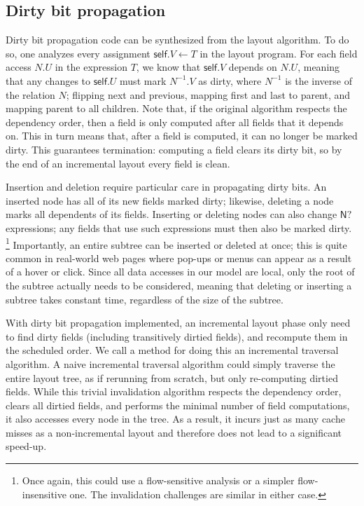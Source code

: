 \subsection{Dirty bit propagation}

Dirty bit propagation code
  can be synthesized from the layout algorithm.
To do so, one analyzes every assignment $\mathsf{self}.V \gets T$
  in the layout program.
For each field access $N.U$ in the expression $T$,
  we know that $\mathsf{self}.V$ depends on $N.U$,
  meaning that any changes to $\mathsf{self}.U$
  must mark $N^{-1}.V$ as dirty,
  where $N^{-1}$ is the inverse of the relation $N$;
  flipping \textsf{next} and \textsf{previous},
  mapping \textsf{first} and \textsf{last} to \textsf{parent},
  and mapping \textsf{parent} to all children.
Note that, if the original algorithm respects the dependency order,
  then a field is only computed after all fields that it depends on.
This in turn means that, after a field is computed,
  it can no longer be marked dirty.
This guarantees termination:
  computing a field clears its dirty bit, so by the end of an incremental layout
  every field is clean.

Insertion and deletion require particular care
  in propagating dirty bits.
An inserted node has all of its new fields marked dirty;
  likewise, deleting a node marks all dependents of its fields.
Inserting or deleting nodes can also change
  $\mathsf{N?}$ expressions;
  any fields that use such expressions must then
  also be marked dirty.%
\footnote{Once again,
  this could use a flow-sensitive analysis or a simpler
  flow-insensitive one.
The invalidation challenges are similar in either case.}
Importantly, an entire subtree can be inserted or deleted at once;
  this is quite common in real-world web pages
  where pop-ups or menus can appear as a result of a hover or click.
Since all data accesses in our model are local,
  only the root of the subtree actually needs to be considered,
  meaning that deleting or inserting a subtree takes constant time,
  regardless of the size of the subtree.

With dirty bit propagation implemented,
  an incremental layout phase only need to 
  find dirty fields (including transitively dirtied fields),
  and recompute them in the scheduled order.
We call a method for doing this an incremental traversal algorithm.
A naive incremental traversal algorithm
  could simply traverse the entire layout tree, 
  as if rerunning from scratch, but only re-computing dirtied fields. 
While this trivial invalidation algorithm
  respects the dependency order, clears all dirtied fields,
  and performs the minimal number of field computations,
  it also accesses every node in the tree.
As a result, it incurs
  just as many cache misses as a non-incremental layout
  and therefore does not lead to a significant speed-up.


